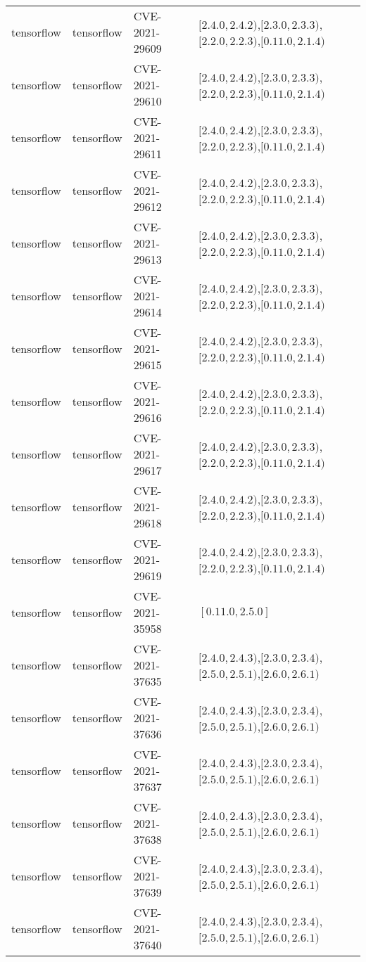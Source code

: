 \begin{tabular}{llll}
tensorflow & tensorflow & CVE-2021-29609 & $[2.4.0,2.4.2)$,$[2.3.0,2.3.3)$,$[2.2.0,2.2.3)$,$[0.11.0,2.1.4)$ \\
tensorflow & tensorflow & CVE-2021-29610 & $[2.4.0,2.4.2)$,$[2.3.0,2.3.3)$,$[2.2.0,2.2.3)$,$[0.11.0,2.1.4)$ \\
tensorflow & tensorflow & CVE-2021-29611 & $[2.4.0,2.4.2)$,$[2.3.0,2.3.3)$,$[2.2.0,2.2.3)$,$[0.11.0,2.1.4)$ \\
tensorflow & tensorflow & CVE-2021-29612 & $[2.4.0,2.4.2)$,$[2.3.0,2.3.3)$,$[2.2.0,2.2.3)$,$[0.11.0,2.1.4)$ \\
tensorflow & tensorflow & CVE-2021-29613 & $[2.4.0,2.4.2)$,$[2.3.0,2.3.3)$,$[2.2.0,2.2.3)$,$[0.11.0,2.1.4)$ \\
tensorflow & tensorflow & CVE-2021-29614 & $[2.4.0,2.4.2)$,$[2.3.0,2.3.3)$,$[2.2.0,2.2.3)$,$[0.11.0,2.1.4)$ \\
tensorflow & tensorflow & CVE-2021-29615 & $[2.4.0,2.4.2)$,$[2.3.0,2.3.3)$,$[2.2.0,2.2.3)$,$[0.11.0,2.1.4)$ \\
tensorflow & tensorflow & CVE-2021-29616 & $[2.4.0,2.4.2)$,$[2.3.0,2.3.3)$,$[2.2.0,2.2.3)$,$[0.11.0,2.1.4)$ \\
tensorflow & tensorflow & CVE-2021-29617 & $[2.4.0,2.4.2)$,$[2.3.0,2.3.3)$,$[2.2.0,2.2.3)$,$[0.11.0,2.1.4)$ \\
tensorflow & tensorflow & CVE-2021-29618 & $[2.4.0,2.4.2)$,$[2.3.0,2.3.3)$,$[2.2.0,2.2.3)$,$[0.11.0,2.1.4)$ \\
tensorflow & tensorflow & CVE-2021-29619 & $[2.4.0,2.4.2)$,$[2.3.0,2.3.3)$,$[2.2.0,2.2.3)$,$[0.11.0,2.1.4)$ \\
tensorflow & tensorflow & CVE-2021-35958 & $[0.11.0,2.5.0]$ \\
tensorflow & tensorflow & CVE-2021-37635 & $[2.4.0,2.4.3)$,$[2.3.0,2.3.4)$,$[2.5.0,2.5.1)$,$[2.6.0,2.6.1)$ \\
tensorflow & tensorflow & CVE-2021-37636 & $[2.4.0,2.4.3)$,$[2.3.0,2.3.4)$,$[2.5.0,2.5.1)$,$[2.6.0,2.6.1)$ \\
tensorflow & tensorflow & CVE-2021-37637 & $[2.4.0,2.4.3)$,$[2.3.0,2.3.4)$,$[2.5.0,2.5.1)$,$[2.6.0,2.6.1)$ \\
tensorflow & tensorflow & CVE-2021-37638 & $[2.4.0,2.4.3)$,$[2.3.0,2.3.4)$,$[2.5.0,2.5.1)$,$[2.6.0,2.6.1)$ \\
tensorflow & tensorflow & CVE-2021-37639 & $[2.4.0,2.4.3)$,$[2.3.0,2.3.4)$,$[2.5.0,2.5.1)$,$[2.6.0,2.6.1)$ \\
tensorflow & tensorflow & CVE-2021-37640 & $[2.4.0,2.4.3)$,$[2.3.0,2.3.4)$,$[2.5.0,2.5.1)$,$[2.6.0,2.6.1)$ \\

\end{tabular}
